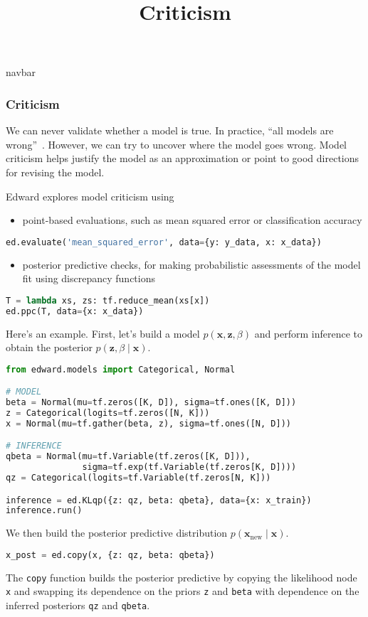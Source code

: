 \title{Criticism}

{{navbar}}

\subsubsection{Criticism}

We can never validate whether a model is true. In practice, ``all
models are wrong''~\citep{box1976science}. However, we can try to
uncover where the model goes wrong. Model criticism helps justify the
model as an approximation or point to good directions for revising the
model.

Edward explores model criticism using
\begin{itemize}
  \item point-based evaluations, such as mean squared error or
  classification accuracy
\end{itemize}
\begin{lstlisting}[language=Python]
ed.evaluate('mean_squared_error', data={y: y_data, x: x_data})
\end{lstlisting}
\begin{itemize}
  \item posterior predictive checks, for making probabilistic
  assessments of the model fit using discrepancy functions
\end{itemize}
\begin{lstlisting}[language=Python]
T = lambda xs, zs: tf.reduce_mean(xs[x])
ed.ppc(T, data={x: x_data})
\end{lstlisting}

Here's an example. First, let's build a model $p(\mathbf{x},
\mathbf{z}, \beta)$ and perform inference to obtain the posterior
$p(\mathbf{z}, \beta\mid\mathbf{x})$.
\begin{lstlisting}[language=Python]
from edward.models import Categorical, Normal

# MODEL
beta = Normal(mu=tf.zeros([K, D]), sigma=tf.ones([K, D]))
z = Categorical(logits=tf.zeros([N, K]))
x = Normal(mu=tf.gather(beta, z), sigma=tf.ones([N, D]))

# INFERENCE
qbeta = Normal(mu=tf.Variable(tf.zeros([K, D])),
               sigma=tf.exp(tf.Variable(tf.zeros[K, D])))
qz = Categorical(logits=tf.Variable(tf.zeros[N, K]))

inference = ed.KLqp({z: qz, beta: qbeta}, data={x: x_train})
inference.run()
\end{lstlisting}
We then build the posterior predictive distribution
$p(\mathbf{x}_{\text{new}}\mid \mathbf{x})$.
\begin{lstlisting}[language=Python]
x_post = ed.copy(x, {z: qz, beta: qbeta})
\end{lstlisting}
The \texttt{copy} function builds the posterior predictive by copying
the likelihood node \texttt{x} and swapping its dependence on the
priors \texttt{z} and \texttt{beta} with dependence on the inferred
posteriors \texttt{qz} and \texttt{qbeta}.


